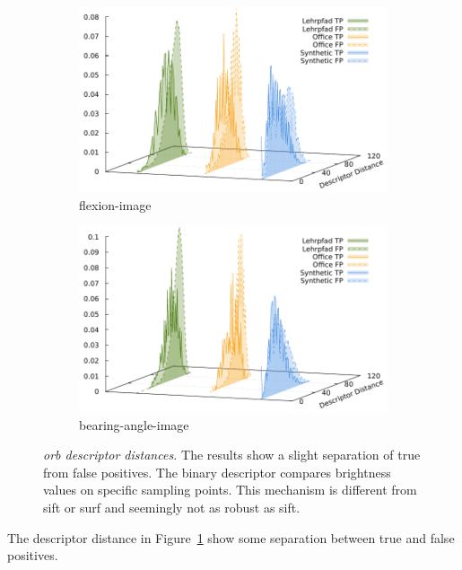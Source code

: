 \begin{figure}[htp]
\begin{subfigure}[t]{0.45\linewidth}
    \includegraphics[width=\linewidth]{chapter06/results/ORB/flexion/descriptor_distances.pdf}%
    \caption{\gls{flexion-image}}
\end{subfigure}\quad
\begin{subfigure}[t]{0.45\linewidth}
    \includegraphics[width=\linewidth]{chapter06/results/ORB/bearing/descriptor_distances.pdf}%
    \caption{\gls{bearing-angle-image}}
\end{subfigure}
\caption[\acrshort{orb} descriptor distances]{\emph{\acrshort{orb} descriptor distances.} The results show a slight separation of true from false positives. The binary descriptor compares brightness values on specific sampling points. This mechanism is different from \acrshort{sift} or \acrshort{surf} and seemingly not as robust as \acrshort{sift}.}\label{fig:orb_descriptor_distances}
\end{figure}
The descriptor distance in Figure~\ref{fig:orb_descriptor_distances} show some separation between true and false positives.

